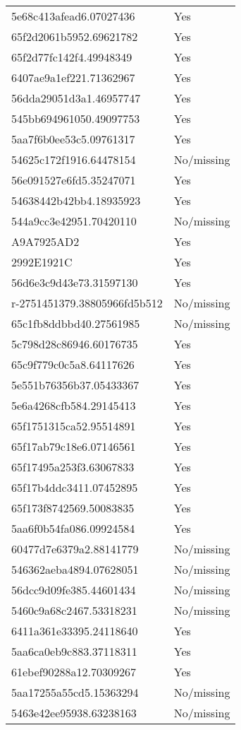 \begin{tabular}{ll}
5e68c413afead6.07027436 & Yes \\
65f2d2061b5952.69621782 & Yes \\
65f2d77fc142f4.49948349 & Yes \\
6407ae9a1ef221.71362967 & Yes \\
56dda29051d3a1.46957747 & Yes \\
545bb694961050.49097753 & Yes \\
5aa7f6b0ee53c5.09761317 & Yes \\
54625c172f1916.64478154 & No/missing \\
56e091527e6fd5.35247071 & Yes \\
54638442b42bb4.18935923 & Yes \\
544a9cc3e42951.70420110 & No/missing \\
A9A7925AD2 & Yes \\
2992E1921C & Yes \\
56d6e3c9d43e73.31597130 & Yes \\
r-2751451379.38805966fd5b512 & No/missing \\
65c1fb8ddbbd40.27561985 & No/missing \\
5c798d28c86946.60176735 & Yes \\
65c9f779c0c5a8.64117626 & Yes \\
5e551b76356b37.05433367 & Yes \\
5e6a4268cfb584.29145413 & Yes \\
65f1751315ca52.95514891 & Yes \\
65f17ab79c18e6.07146561 & Yes \\
65f17495a253f3.63067833 & Yes \\
65f17b4ddc3411.07452895 & Yes \\
65f173f8742569.50083835 & Yes \\
5aa6f0b54fa086.09924584 & Yes \\
60477d7e6379a2.88141779 & No/missing \\
546362aeba4894.07628051 & No/missing \\
56dcc9d09fe385.44601434 & No/missing \\
5460c9a68c2467.53318231 & No/missing \\
6411a361e33395.24118640 & Yes \\
5aa6ca0eb9c883.37118311 & Yes \\
61ebef90288a12.70309267 & Yes \\
5aa17255a55cd5.15363294 & No/missing \\
5463e42ee95938.63238163 & No/missing \\

\end{tabular}
